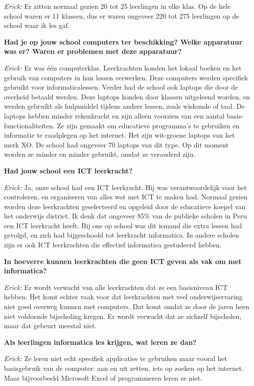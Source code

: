 \textit{Erick:} Er zitten normaal gezien 20 tot 25 leerlingen in elke klas. Op de hele school waren er 11 klassen, dus er waren ongeveer 220 tot 275 leerlingen op de school waar ik les gaf. %

\textbf{Had je op jouw school computers ter beschikking? Welke apparatuur was er? Waren er problemen met deze apparatuur?}

\textit{Erick:} Er was één computerklas. Leerkrachten konden het lokaal boeken en het gebruik van computers in hun lessen verwerken. Deze computers werden specifiek gebruikt voor informaticalessen. Verder had de school ook laptops die door de overheid betaald werden. Deze laptops konden door klassen uitgeleend worden, en werden gebruikt als hulpmiddel tijdens andere lessen, zoals wiskunde of taal. De laptops hebben minder rekenkracht en zijn alleen voorzien van een aantal basis-functionaliteiten. Ze zijn gemaakt om educatieve programma's te gebruiken en informatie te raadplegen op het internet. Het zijn wit-groene laptops van het merk XO. De school had ongeveer 70 laptops van dit type. Op dit moment worden ze minder en minder gebruikt, omdat ze verouderd  zijn.

\textbf{Had jouw school een ICT leerkracht?}

\textit{Erick:} Ja, onze school had een ICT leerkracht. Hij was verantwoordelijk voor het controleren, en organiseren van alles wat met ICT te maken had. Normaal gezien worden deze leerkrachten geselecteerd en opgeleid door de educatieve koepel van het onderwijs district. Ik denk dat ongeveer 85\% van de publieke scholen in Peru een ICT leerkracht heeft. Bij ons op school was dit iemand die extra lessen had gevolgd, en zich had bijgeschoold tot leerkracht informatica. In andere scholen zijn er ook ICT leerkrachten die effectief informatica gestudeerd hebben.

\textbf{In hoeverre kunnen leerkrachten die geen ICT geven als vak om met informatica?}

\textit{Erick:} Er wordt verwacht van alle leerkrachten dat ze een basisniveau ICT hebben. Het komt echter vaak voor dat leerkrachten met veel onderwijservaring niet goed overweg kunnen met computers. Dat komt omdat ze door de jaren heen niet voldoende bijscholing kregen. Er wordt verwacht dat ze zichzelf bijscholen, maar dat gebeurt meestal niet.

\textbf{Als leerlingen informatica les krijgen, wat leren ze dan?}

\textit{Erick:} Ze leren niet echt specifiek applicaties te gebruiken maar vooral het basisgebruik van de computer: aan en uit zetten, iets op zoeken op het internet. Maar bijvoorbeeld Microsoft Excel of programmeren leren ze niet.

